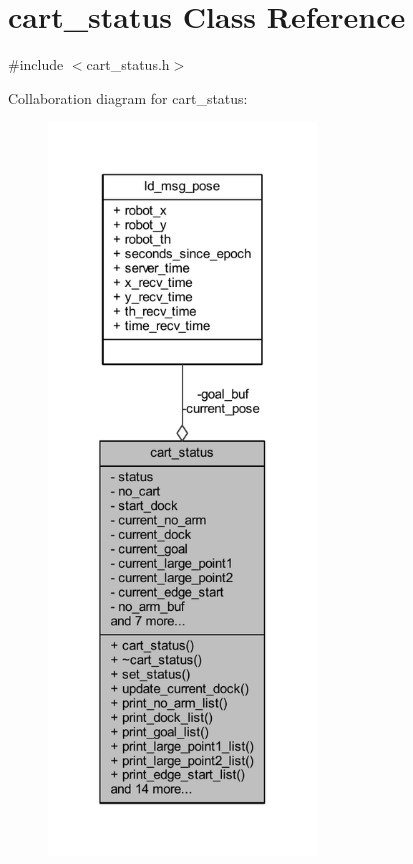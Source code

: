 \hypertarget{classcart__status}{}\section{cart\+\_\+status Class Reference}
\label{classcart__status}


{\ttfamily \#include $<$cart\+\_\+status.\+h$>$}



Collaboration diagram for cart\+\_\+status\+:
\nopagebreak
\begin{figure}[H]
\begin{center}
\leavevmode
\includegraphics[height=550pt]{classcart__status__coll__graph}
\end{center}
\end{figure}
